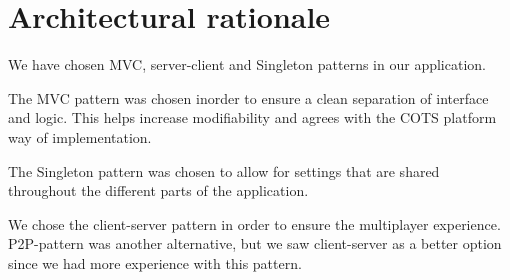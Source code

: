 \section{Architectural rationale}
\label{sec:architecturalrationale}

We have chosen MVC, server-client and Singleton patterns in our application.

The MVC pattern was chosen inorder to ensure a clean separation of interface
and logic. This helps increase modifiability and agrees with the COTS platform
way of implementation.

The Singleton pattern was chosen to allow for settings that are shared
throughout the different parts of the application.

We chose the client-server pattern in order to ensure the multiplayer
experience. P2P-pattern was another alternative, but we saw client-server as a
better option since we had more experience with this pattern.

